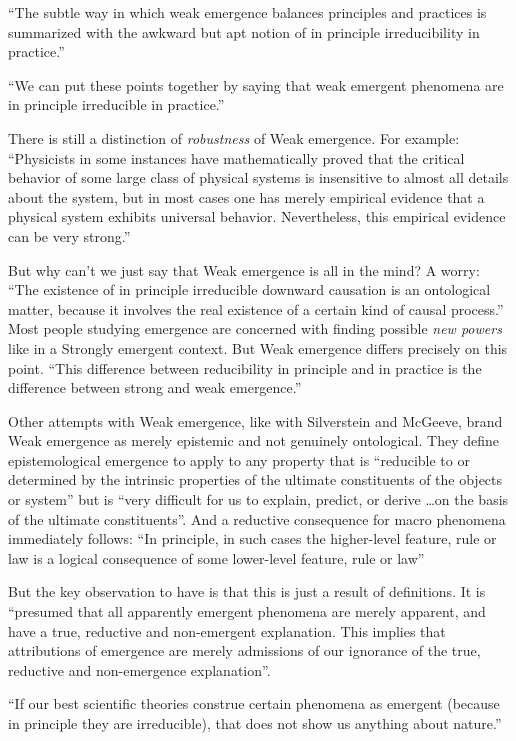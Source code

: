 \documentclass{article}
\newcommand{\ti}[1]{\textit{#1}}
\begin{document}
``The subtle way in which weak emergence balances principles and practices is summarized with the awkward but apt notion of in principle irreducibility in practice.''

``We can put these points together by saying that weak emergent phenomena are in principle irreducible in practice.''

There is still a distinction of \ti{robustness} of Weak emergence. For example: ``Physicists in some instances have mathematically proved that the critical behavior of some large class of physical systems is insensitive to almost all details about the system, but in most cases one has merely empirical evidence that a physical system exhibits universal behavior. Nevertheless, this empirical evidence can be very strong.''

But why can't we just say that Weak emergence is all in the mind? A worry: ``The existence of in principle irreducible downward causation is an ontological matter, because it involves the real existence of a certain kind of causal process.'' Most people studying emergence are concerned with finding possible \ti{new powers} like in a Strongly emergent context. But Weak emergence differs precisely on this point. ``This difference between reducibility in principle and in practice is the difference between strong and weak emergence.''

Other attempts with Weak emergence, like with Silverstein and McGeeve, brand Weak emergence as merely epistemic and not genuinely ontological. They define epistemological emergence to apply to any property that is ``reducible to or determined by the intrinsic properties of the ultimate constituents of the objects or system'' but is ``very difficult for us to explain, predict, or derive \dots on the basis of the ultimate constituents''. And a reductive consequence for macro phenomena immediately follows: ``In principle, in such cases the higher-level feature, rule or law is a logical consequence of some lower-level feature, rule or law''

But the key observation to have is that this is just a result of definitions. It is ``presumed that all apparently emergent phenomena are merely apparent, and have a true, reductive and non-emergent explanation. This implies that attributions of emergence are merely admissions of our ignorance of the true, reductive and non-emergence explanation''.

``If our best scientific theories construe certain phenomena as emergent (because in principle they are irreducible), that does not show us anything about nature.''
\end{document}
